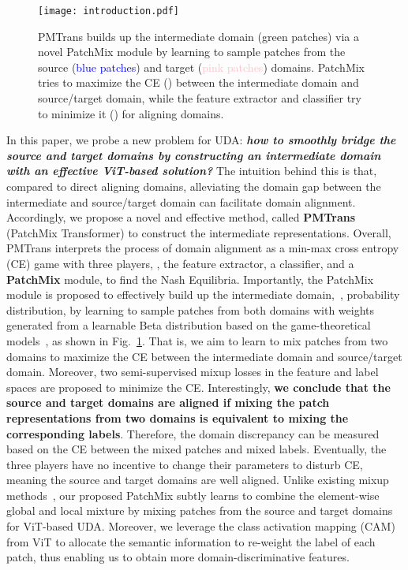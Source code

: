 \documentclass[10pt,twocolumn,letterpaper, ]{article}
\begin{document}
\begin{figure}
    \centering
    \texttt{[image: introduction.pdf]}
    \captionsetup{font=small}
    \vspace{-8pt}
    \caption{PMTrans builds up the intermediate domain (\textcolor{green(pigment)}{green patches}) via a novel PatchMix module by learning to sample patches from the source (\textcolor{blue}{blue patches}) and target (\textcolor{pink}{pink patches}) domains. PatchMix tries to maximize the CE (\textcolor{green(pigment)}{}) between the intermediate domain and source/target domain, while the feature extractor and classifier try to minimize it (\textcolor{red}{}) for aligning domains.}
    \label{fig:cover_mix}
    \vspace{-15pt}
\end{figure}
In this paper, we probe a new problem for UDA: \textbf{\textit{how to smoothly bridge the source and target domains by constructing an intermediate domain with an effective ViT-based solution?}}
The intuition behind this is that, compared to direct aligning domains,  
alleviating the domain gap between the intermediate and source/target domain can facilitate domain alignment. 
Accordingly, we propose a novel and effective method, called \textbf{PMTrans} (PatchMix Transformer) to construct the intermediate representations. 
Overall, PMTrans interprets the process of domain alignment as a min-max cross entropy (CE) game with three players, \ie, the feature extractor, a classifier, and a \textbf{PatchMix} module, to find the Nash Equilibria. Importantly, the PatchMix module is proposed to effectively build up the intermediate domain,~\ie, probability distribution, by learning to sample patches from both domains with weights generated from a learnable Beta distribution based on the game-theoretical models~\cite{abs-2202-05352, bacsar1998dynamic, MazumdarRS20}, as shown in Fig.~\ref{fig:cover_mix}. That is, we aim to learn to mix patches from two domains to maximize the CE between the intermediate domain and source/target domain. Moreover, two semi-supervised mixup losses in the feature and label spaces are proposed to minimize the CE. Interestingly, \textbf{we conclude that the source and target domains are aligned if mixing the patch representations from two domains is equivalent to mixing the corresponding labels}. Therefore, the domain discrepancy can be measured based on the CE between the mixed patches and mixed labels. Eventually, the three players have no incentive to change their parameters to disturb CE, meaning the source and target domains are well aligned. Unlike existing mixup methods~\cite{ZhangCDL18, YunHCOYC19, UddinMSCB21}, our proposed PatchMix subtly learns to combine the element-wise global and local mixture by mixing patches from the source and target domains for ViT-based UDA. Moreover, we leverage the class activation mapping (CAM) from ViT to allocate the semantic information to re-weight the label of each patch, thus enabling us to obtain more domain-discriminative features. 
\end{document}
